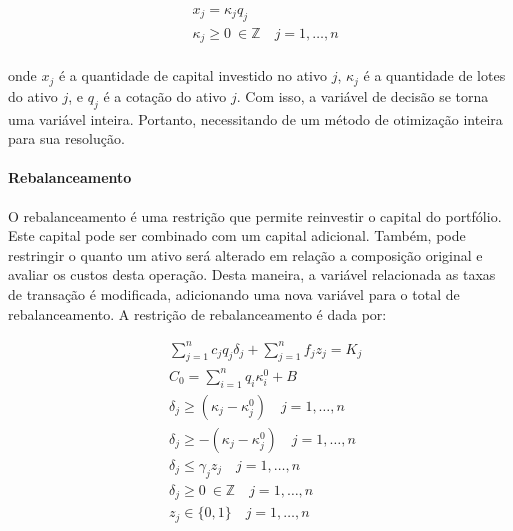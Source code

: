                     \begin{equation}
                        \begin{aligned}
                            & x_{j} = \kappa_{j} q_{j} \\
                            &\kappa_{j} \geq 0 \ \in \mathbb{Z} \quad j=1, \ldots, n \\
                        \end{aligned}
                    \end{equation}

                    \noindent onde $x_{j}$ é a quantidade de capital investido no ativo $j$, $\kappa_{j}$ é a quantidade de lotes do ativo $j$, e $q_{j}$ é a cotação do ativo $j$. Com isso, a variável de decisão se torna uma variável inteira. Portanto, necessitando de um método de otimização inteira para sua resolução.
                    
                \paragraph{Rebalanceamento}

                    \ipar O rebalanceamento é uma restrição que permite reinvestir o capital do portfólio. Este capital pode ser combinado com um capital adicional. Também, pode restringir o quanto um ativo será alterado em relação a composição original e avaliar os custos desta operação. Desta maneira, a variável relacionada as taxas de transação é modificada, adicionando uma nova variável para o total de rebalanceamento. A restrição de rebalanceamento é dada por:

                    \begin{equation}
                        \begin{aligned}
                            & \sum_{j=1}^{n}c_{j}q_{j}\delta_{j} + \sum_{j=1}^{n} f_{j} z_{j}  = K_{j} \\
                            & C_{0} = \sum_{i=1}^{n}q_{i}\kappa_{i}^{0}+ B \\
                            & \delta_{j} \geq \left( \kappa_{j} -\kappa_{j}^{0} \right) \quad j=1, \ldots, n\\
                            & \delta_{j} \geq -\left( \kappa_{j} -\kappa_{j}^{0} \right) \quad j=1, \ldots, n\\
                            & \delta_{j} \leq \gamma_{j}z_{j} \quad j=1, \ldots, n\\
                            & \delta_{j} \geq 0 \ \in \mathbb{Z} \quad j=1, \ldots, n\\
                            & z_{j} \in\{0,1\} \quad j=1, \ldots, n \\
                        \end{aligned}
                    \end{equation}

